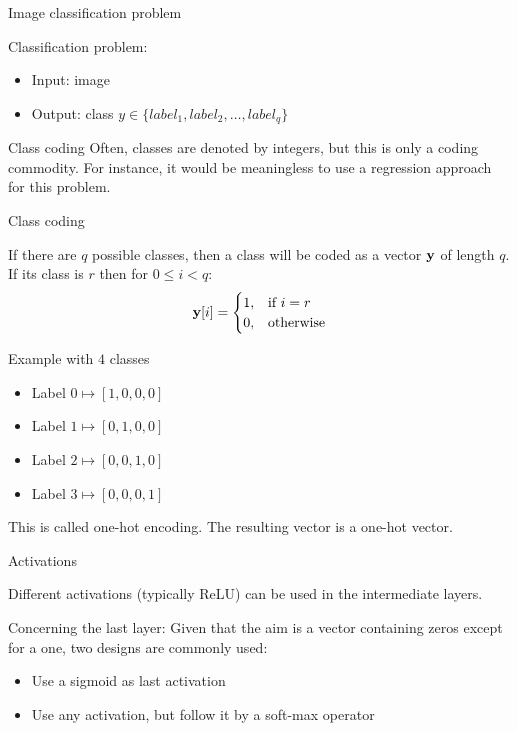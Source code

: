\documentclass[xcolor=pdftex,dvipsnames,table,mathserif]{beamer}
\begin{document}
\begin{frame}{Image classification problem}

  Classification problem:
  \begin{itemize}
  \item Input: image
  \item Output: class $y \in \{ label_1, label_2, \ldots, label_q\}$
  \end{itemize}

  \begin{block}{Class coding}
    Often, classes are denoted by integers, but this is only a coding commodity. For instance, it would be meaningless to use a regression approach for this problem.
  \end{block}

\end{frame}

\begin{frame}{Class coding}

  If there are $q$ possible classes, then a class will be coded as a vector $\mathbf{y}$ of length $q$. If its class is $r$  then for $0 \leq i < q$:
  \[
  \mathbf{y}[i] =
  \begin{cases}
    1, & \text{if}\ i=r \\
    0, & \text{otherwise}
  \end{cases}
  \]

  \begin{block}{Example with $4$ classes}
    \begin{itemize}
    \item
      Label $0 \longmapsto [1,0,0,0]$
    \item
      Label $1 \longmapsto [0,1,0,0]$
    \item
      Label $2 \longmapsto [0,0,1,0]$
    \item
      Label $3 \longmapsto [0,0,0,1]$
    \end{itemize}
  \end{block}

This is called \alert{one-hot encoding}. The resulting vector is a one-hot vector.

\end{frame}


\begin{frame}{Activations}

  Different activations (typically ReLU) can be used in the intermediate layers.
  \vspace{1em}

  Concerning the last layer: Given that the aim is a vector containing zeros except for a one, two designs are commonly used:

  \begin{itemize}
  \item Use a sigmoid as last activation
  \item Use any activation, but follow it by a soft-max operator
  \end{itemize}

\end{frame}
\end{document}
